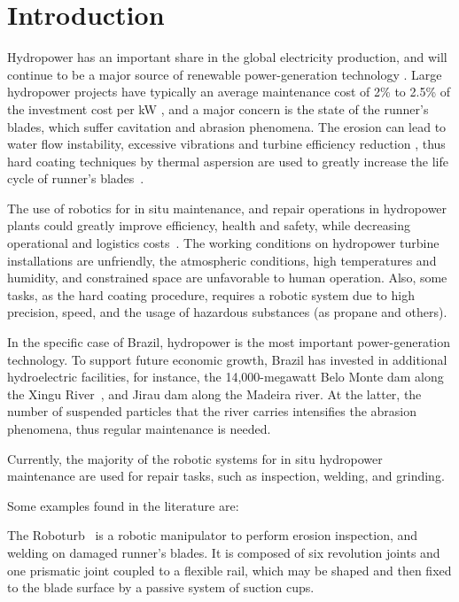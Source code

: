 \section{Introduction}

Hydropower has an important share in the global electricity production, and
will continue to be a major source of renewable power-generation technology
\cite{iea}. Large hydropower projects have typically an average maintenance
cost of 2\% to 2.5\% of the investment cost per kW \cite{irena}, and a major
concern is the state of the runner's blades, which suffer cavitation and
abrasion phenomena. The erosion can lead to water flow instability, excessive
vibrations and turbine efficiency reduction \cite{goldemberg2007energia}, thus
hard coating techniques by thermal aspersion are used to greatly increase the
life cycle of runner's blades~\cite{krella2011new}.

The use of robotics for in situ maintenance, and repair operations in
hydropower plants could greatly improve efficiency, health and safety, while
decreasing operational and logistics costs~\cite{hazel2012field}. The working
conditions on hydropower turbine installations are unfriendly, the atmospheric
conditions, high temperatures and humidity, and constrained space are
unfavorable to human operation. Also, some tasks, as the hard coating
procedure, requires a robotic system due to high precision, speed, and the
usage of hazardous substances (as propane and others).

In the specific case of Brazil, hydropower is the most important
power-generation technology. To support future economic growth, Brazil has
invested in additional hydroelectric facilities, for instance, the
14,000-megawatt Belo Monte dam along the Xingu River~\cite{eia}, and Jirau dam
along the Madeira river. At the latter, the number of suspended particles that
the river carries intensifies the abrasion phenomena, thus regular maintenance
is needed.

Currently, the majority of the robotic systems for in situ hydropower
maintenance are used for repair tasks, such as inspection, welding, and
grinding. 

Some examples found in the literature are:

The Roboturb~\cite{roboturb} is a robotic manipulator to perform erosion
inspection, and welding on damaged runner's blades. It is composed of six
revolution joints and one prismatic joint coupled to a flexible rail, which may
be shaped and then fixed to the blade surface by a passive system of suction cups.

